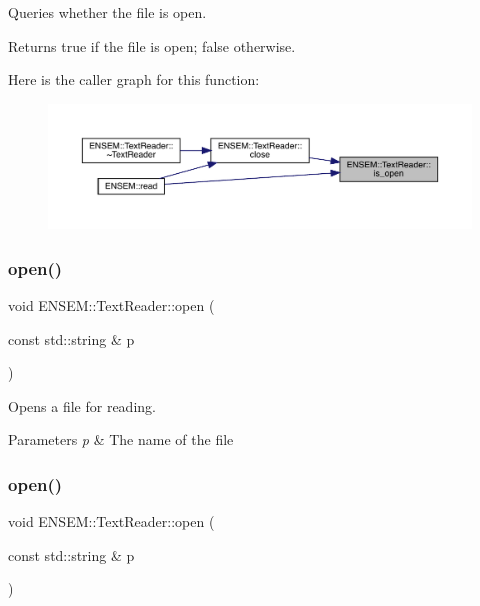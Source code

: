Queries whether the file is open. 

\begin{DoxyReturn}{Returns}
true if the file is open; false otherwise. 
\end{DoxyReturn}
Here is the caller graph for this function\+:
\nopagebreak
\begin{figure}[H]
\begin{center}
\leavevmode
\includegraphics[width=350pt]{d4/d23/classENSEM_1_1TextReader_a67e8ac68ff413c1101522eedafc2d994_icgraph}
\end{center}
\end{figure}
\mbox{\label{classENSEM_1_1TextReader_a167e412dc7a3a56fae35ccb4cc9d9029}} 
\subsubsection{\texorpdfstring{open()}{open()}\hspace{0.1cm}{\footnotesize\ttfamily [1/3]}}
{\footnotesize\ttfamily void E\+N\+S\+E\+M\+::\+Text\+Reader\+::open (\begin{DoxyParamCaption}\item[{const std\+::string \&}]{p }\end{DoxyParamCaption})}



Opens a file for reading. 


\begin{DoxyParams}{Parameters}
{\em p} & The name of the file \\
\hline
\end{DoxyParams}
\mbox{\label{classENSEM_1_1TextReader_a167e412dc7a3a56fae35ccb4cc9d9029}} 
\subsubsection{\texorpdfstring{open()}{open()}\hspace{0.1cm}{\footnotesize\ttfamily [2/3]}}
{\footnotesize\ttfamily void E\+N\+S\+E\+M\+::\+Text\+Reader\+::open (\begin{DoxyParamCaption}\item[{const std\+::string \&}]{p }\end{DoxyParamCaption})}



